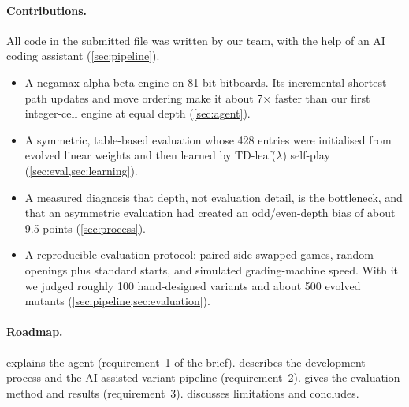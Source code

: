 \paragraph{Contributions.}
All code in the submitted file was written by our team, with the help of an AI coding assistant
(\cref{sec:pipeline}).
\begin{itemize}
  \item A negamax alpha-beta engine on 81-bit bitboards. Its incremental shortest-path updates
        and move ordering make it about 7$\times$ faster than our first integer-cell engine at
        equal depth (\cref{sec:agent}).
  \item A symmetric, table-based evaluation whose 428 entries were initialised from evolved
        linear weights and then learned by TD-leaf($\lambda$) self-play
        (\cref{sec:eval,sec:learning}).
  \item A measured diagnosis that depth, not evaluation detail, is the bottleneck, and that an
        asymmetric evaluation had created an odd/even-depth bias of about 9.5 points
        (\cref{sec:process}).
  \item A reproducible evaluation protocol: paired side-swapped games, random openings plus
        standard starts, and simulated grading-machine speed. With it we judged roughly 100
        hand-designed variants and about 500 evolved mutants (\cref{sec:pipeline,sec:evaluation}).
\end{itemize}

\paragraph{Roadmap.}
 explains the agent (requirement~1 of the brief).
 describes the development process and the AI-assisted variant pipeline
(requirement~2).  gives the evaluation method and results (requirement~3).
 discusses limitations and concludes.
